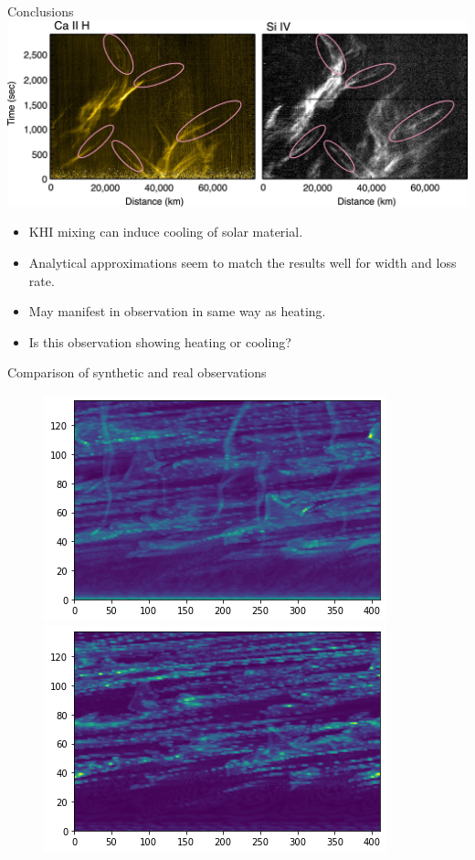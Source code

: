 \documentclass[10pt,aspectratio=169,usenames,dvipsnames]{beamer}
\begin{document}
\begin{frame}{Conclusions}
\includegraphics[width=0.95\linewidth]{2023Dundee/Figures/observation.png}
\begin{itemize}
    \item KHI mixing can induce cooling of solar material.
    \item Analytical approximations seem to match the results well for width and loss rate.
    \item May manifest in observation in same way as heating.
    \item Is this observation showing heating or cooling?
\end{itemize}
\end{frame}

\begin{frame}{Comparison of synthetic and real observations}
\begin{figure}
\includegraphics[width=0.45\linewidth]{2023Dundee/Figures/mg2test.png}
\includegraphics[width=0.45\linewidth]{2023Dundee/Figures/si4test.png}
\end{figure}
\end{frame}
\end{document}

